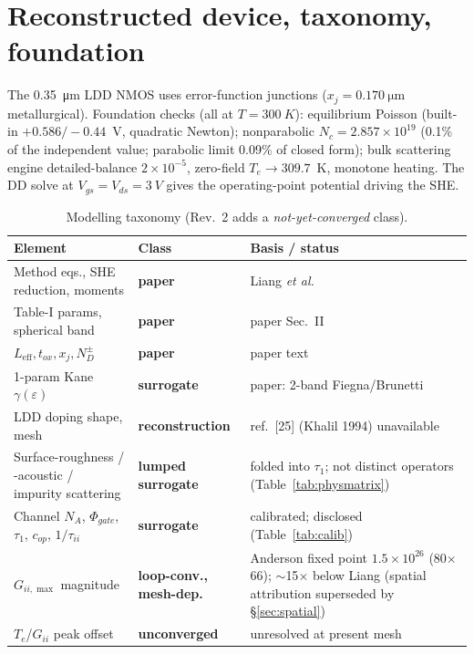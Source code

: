 \documentclass[11pt]{article}
\newcommand{\eps}{\varepsilon}
\begin{document}
\section{Reconstructed device, taxonomy, foundation}\label{sec:device}
The \SI{0.35}{\micro\meter} LDD NMOS uses error-function junctions ($x_j=\SI{0.170}{\micro
\meter}$ metallurgical). Foundation checks (all at $T=\SI{300}{K}$): equilibrium Poisson (built-in
$+0.586/-0.44$~V, quadratic Newton); nonparabolic $N_c=2.857\times10^{19}$ (0.1\% of the
independent value; parabolic limit 0.09\% of closed form); bulk scattering engine
detailed-balance $2\times10^{-5}$, zero-field $T_e\to309.7$~K, monotone heating. The DD solve
at $V_{gs}=V_{ds}=\SI{3}{V}$ gives the operating-point potential driving the SHE.

\begin{table}[h]\centering\small
\caption{Modelling taxonomy (Rev.~2 adds a \emph{not-yet-converged} class).}\label{tab:taxonomy}
\begin{tabular}{p{5.4cm}p{3.0cm}p{5.8cm}}
\toprule
Element & Class & Basis / status \\
\midrule
Method eqs., SHE reduction, moments & \textbf{paper} & Liang \emph{et al.} \\
Table-I params, spherical band & \textbf{paper} & paper Sec.~II \\
$L_{\text{eff}},t_{ox},x_j,N_D^\pm$ & \textbf{paper} & paper text \\
1-param Kane $\gamma(\eps)$ & \textbf{surrogate} & paper: 2-band Fiegna/Brunetti \\
LDD doping shape, mesh & \textbf{reconstruction} & ref.~[25] (Khalil 1994) unavailable \\
Surface-roughness / -acoustic / impurity scattering & \textbf{lumped surrogate} & folded into $\tau_1$; not distinct operators (Table~\ref{tab:physmatrix}) \\
Channel $N_A$, $\Phi_{gate}$, $\tau_1$, $c_{op}$, $1/\tau_{ii}$ & \textbf{surrogate} & calibrated; disclosed (Table~\ref{tab:calib}) \\
$G_{ii,\max}$ magnitude & \textbf{loop-conv., mesh-dep.} & Anderson fixed point $1.5\times10^{26}$ (80$\times$66); $\sim$15$\times$ below Liang (spatial attribution superseded by \S\ref{sec:spatial}) \\
$T_e$/$G_{ii}$ peak offset & \textbf{unconverged} & unresolved at present mesh \\
\bottomrule
\end{tabular}
\end{table}
\end{document}
